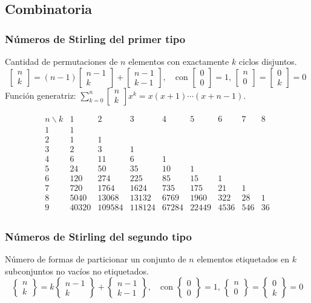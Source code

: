 \subsection{Combinatoria}

\newcommand{\stirlingfirst}[2]{\left[ \begin{matrix} #1 \\ #2 \end{matrix} \right]}
\newcommand{\stirlingsecond}[2]{\left\{ \begin{matrix} #1 \\ #2 \end{matrix} \right\}}

\subsubsection{Números de Stirling del primer tipo}
Cantidad de permutaciones de $n$ elementos con exactamente $k$ ciclos disjuntos.
\[
\stirlingfirst{n}{k} = (n-1) \stirlingfirst{n-1}{k} + \stirlingfirst{n-1}{k-1}, \quad \text{con } \stirlingfirst{0}{0}=1, \, \stirlingfirst{n}{0}=\stirlingfirst{0}{k}=0
\]
Función generatriz: $\sum_{k=0}^n \stirlingfirst{n}{k} x^k = x(x+1)\cdots(x+n-1)$.

\[
\begin{array}{c|ccccccccc}
n \backslash k & 1 & 2 & 3 & 4 & 5 & 6 & 7 & 8   \\
\hline
1 & 1 & & & & & & &   \\
2 & 1 & 1 & & & & & &   \\
3 & 2 & 3 & 1 & & & & &   \\
4 & 6 & 11 & 6 & 1 & & & &  \\
5 & 24 & 50 & 35 & 10 & 1 & & &   \\
6 & 120 & 274 & 225 & 85 & 15 & 1 & &  \\
7 & 720 & 1764 & 1624 & 735 & 175 & 21 & 1 &   \\
8 & 5040 & 13068 & 13132 & 6769 & 1960 & 322 & 28 & 1   \\
9 & 40320 & 109584 & 118124 & 67284 & 22449 & 4536 & 546 & 36   \\
\end{array}
\]

\subsubsection{Números de Stirling del segundo tipo}
Número de formas de particionar un conjunto de $n$ elementos etiquetados en $k$ subconjuntos no vacíos no etiquetados.
\[
\stirlingsecond{n}{k} = k \stirlingsecond{n-1}{k} + \stirlingsecond{n-1}{k-1}, \quad \text{con } \stirlingsecond{0}{0}=1, \, \stirlingsecond{n}{0}=\stirlingsecond{0}{k}=0
\]

